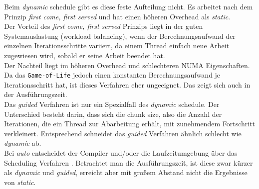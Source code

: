 \documentclass[german,plainarticle,hyperref,utf8]{zihpub}
\begin{document}
	Beim \textit{dynamic} schedule gibt es diese feste Aufteilung nicht. Es arbeitet nach dem Prinzip \textit{first come, first served} und hat einen höheren Overhead als \textit{static}.\\
	Der Vorteil des \textit{first come, first served} Prinzips liegt in der guten Systemauslastung (workload balancing), wenn der Berechnungsaufwand der einzelnen Iterationsschritte variiert, da einem Thread einfach neue Arbeit zugewiesen wird, sobald er seine Arbeit beendet hat.\\
	Der Nachteil liegt im höheren Overhead und schlechteren NUMA Eigenschaften.\\
	Da das \texttt{Game-of-Life} jedoch einen konstanten Berechnungsaufwand je Iterationsschritt hat, ist dieses Verfahren eher ungeeignet. Das zeigt sich auch in der Ausführungszeit.\\
	
	Das \textit{guided} Verfahren ist nur ein Spezialfall des \textit{dynamic} schedule. Der Unterschied besteht darin, dass sich die chunk size, also die Anzahl der Iterationen, die ein Thread zur Abarbeitung erhält, mit zunehmendem Fortschritt verkleinert. Entsprechend schneidet das \textit{guided} Verfahren ähnlich schlecht wie \textit{dynamic} ab.\\
	
	Bei \textit{auto} entscheidet der Compiler und/oder die Laufzeitumgebung über das Scheduling Verfahren \cite{schedule}. Betrachtet man die Ausführungszeit, ist diese zwar kürzer als \textit{dynamic} und \textit{guided}, erreicht aber mit großem Abstand nicht die Ergebnisse von \textit{static}.
	\appendix
\end{document}
